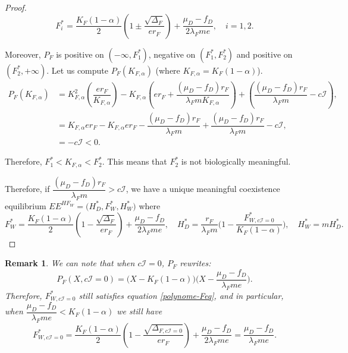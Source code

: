 \documentclass{article}
\newcommand{\lfw}{\lambda_{F}}
\newcommand{\lfw}{\lambda_{F}}
\newcommand{\marc}[1]{\textcolor{teal}{#1}}
\newtheorem{remark}{Remark}
\begin{document}
\begin{proof}
\begin{equation*}
F_i^* = \dfrac{K_F(1-\alpha)}{2}\left(1 \pm \dfrac{\sqrt{\Delta_F}}{er_F}\right) + \dfrac{\mu_D - f_D}{2\lfw m e}, \quad i=1,2.
\end{equation*}

Moreover, $P_F$ is positive on $(-\infty, F_1^*)$, negative on $(F^*_1, F^*_2)$ and positive on $(F^*_2, +\infty)$. Let us compute $P_F(K_{F,\alpha})$ (where $ K_{F,\alpha} = K_F(1-\alpha)$).
\begin{align*}
P_F(K_{F,\alpha}) &= K_{F,\alpha}^2 \left(\dfrac{er_F}{K_{F,\alpha}} \right) - K_{F,\alpha} \left(er_F + \dfrac{(\mu_D - f_D) r_F}{\lfw m K_{F,\alpha}} \right) + \left(\dfrac{(\mu_D - f_D) r_F}{\lfw m} - c\mathcal{I} \right), \\
&= K_{F,\alpha}er_F - K_{F,\alpha}er_F - \dfrac{(\mu_D - f_D) r_F}{\lfw m} + \dfrac{(\mu_D - f_D) r_F}{\lfw m} - c\mathcal{I}, \\
&= -c\mathcal{I}< 0.
\end{align*}

Therefore, $F_1^* < K_{F, \alpha} < F_2^*$. This means that $F_2^*$ is not biologically meaningful.

Therefore, if $\dfrac{(\mu_D - f_D) r_F}{\lfw m} > c\mathcal{I}$, we have a unique meaningful coexistence equilibrium $EE^{HF_W} = \Big(H^*_{D}, F^*_{W}, H^*_{W} \Big)$  
where $$F^*_{W} = \dfrac{K_F(1-\alpha)}{2}\left(1 - \dfrac{\sqrt{\Delta_F}}{er_F}\right) + \dfrac{\mu_D - f_D}{2\lfw m e},\quad
H^*_{D} = \dfrac{r_F}{\lfw m} \Big(1 - \dfrac{F^*_{W, c\mathcal{I} = 0}}{K_F(1-\alpha)} \Big),
\quad 
H^*_{W} = m H^*_{D}.$$
\end{proof}

\begin{remark} \label{RemarqueSimilariteEqCoexistence}
We can note that when $c\mathcal{I}=0$, $P_F$ rewrites:
$$
P_F(X, c\mathcal{I}=0) = \Big(X-K_F(1-\alpha) \Big) \Big(X - \dfrac{\mu_D - f_D}{\lfw m e} \Big).
$$
Therefore, $F^*_{W,c\mathcal{I} =0}$ still satisfies equation \eqref{polynome-Feq}, and in particular, when $\dfrac{\mu_D - f_D}{\lfw m e} < K_F(1-\alpha)$ we still have
$$
F^*_{W, c\mathcal{I} =0} = \dfrac{K_F(1-\alpha)}{2}\left(1 - \dfrac{\sqrt{\Delta_{F, c\mathcal{I} = 0}}}{er_F}\right) + \dfrac{\mu_D - f_D}{2\lfw m e} = \dfrac{\mu_D - f_D}{\lfw m e}.
$$ 
\end{remark}

%
\end{document}
